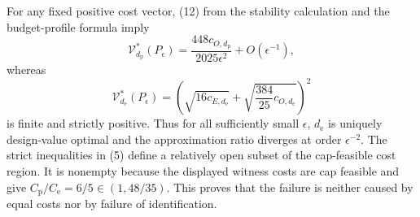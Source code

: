 For any fixed positive cost vector, (12) from the stability calculation and the budget-profile formula imply
\[
 \mathcal V_{d_{\mathrm p}}^*(P_\epsilon)
 =\frac{448c_{O,d_{\mathrm p}}}{2025\epsilon^2}
 +O(\epsilon^{-1}), \tag{6}
\]
whereas
\[
 \mathcal V_{d_{\mathrm e}}^*(P_\epsilon)
 =\left(\sqrt{16c_{E,d_{\mathrm e}}}
 +\sqrt{\frac{384}{25}c_{O,d_{\mathrm e}}}\right)^2 \tag{7}
\]
is finite and strictly positive.  Thus for all sufficiently small \(\epsilon\), \(d_{\mathrm e}\) is uniquely design-value optimal and the approximation ratio diverges at order \(\epsilon^{-2}\).  The strict inequalities in (5) define a relatively open subset of the cap-feasible cost region.  It is nonempty because the displayed witness costs are cap feasible and give \(C_{\mathrm p}/C_{\mathrm e}=6/5\in(1,48/35)\).  This proves that the failure is neither caused by equal costs nor by failure of identification.
